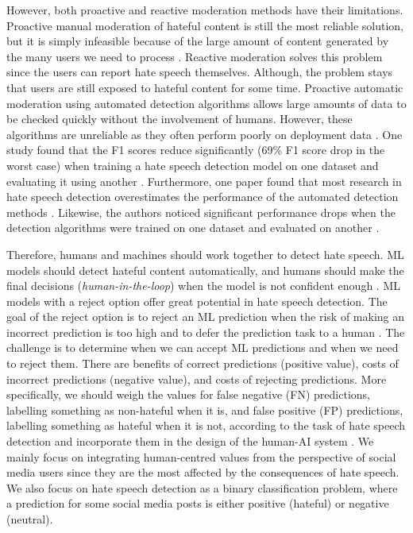 %
However, both proactive and reactive moderation methods have their limitations.
%
Proactive manual moderation of hateful content is still the most reliable solution, but it is simply infeasible because of the large amount of content generated by the many users we need to process \citep{balayn2021automatic}.
%
Reactive moderation solves this problem since the users can report hate speech themselves.
%
Although, the problem stays that users are still exposed to hateful content for some time.
%
Proactive automatic moderation using automated detection algorithms allows large amounts of data to be checked quickly without the involvement of humans.
%
However, these algorithms are unreliable as they often perform poorly on deployment data \citep{balayn2021automatic, grondahl2018all, arango2019hate}.
%
One study found that the F1 scores reduce significantly (69\% F1 score drop in the worst case) when training a hate speech detection model on one dataset and evaluating it using another \citep{grondahl2018all}.
%
Furthermore, one paper found that most research in hate speech detection overestimates the performance of the automated detection methods \citep{arango2019hate}.
%
Likewise, the authors noticed significant performance drops when the detection algorithms were trained on one dataset and evaluated on another \citep{arango2019hate}.
%

%
Therefore, humans and machines should work together to detect hate speech.
%
ML models should detect hateful content automatically, and humans should make the final decisions (\textit{human-in-the-loop}) when the model is not confident enough \citep{woo2020future}.
%
ML models with a reject option offer great potential in hate speech detection.
%
The goal of the reject option is to reject an ML prediction when the risk of making an incorrect prediction is too high and to defer the prediction task to a human \citep{hendrickx2021machine}.
%
The challenge is to determine when we can accept ML predictions and when we need to reject them.
%
There are benefits of correct predictions (positive value), costs of incorrect predictions (negative value), and costs of rejecting predictions.
%
More specifically, we should weigh the values for false negative (FN) predictions, labelling something as non-hateful when it is, and false positive (FP) predictions, labelling something as hateful when it is not, according to the task of hate speech detection and incorporate them in the design of the human-AI system \citep{sayin2021science}.
%
We mainly focus on integrating human-centred values from the perspective of social media users since they are the most affected by the consequences of hate speech.
%
We also focus on hate speech detection as a binary classification problem, where a prediction for some social media posts is either positive (hateful) or negative (neutral).
%

